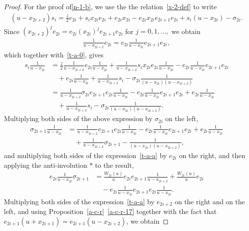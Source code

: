 \documentclass[11pt,a4paper,reqno,svgnames]{amsart}
\theoremstyle{plain}
\theoremstyle{definition}
\numberwithin{equation}{section}
\begin{document}
\begin{proof}
For the proof of\eqref{n-1-b}, we use the the relation~\eqref{x-2-def} to write
\begin{align}\label{t-a-0}
(u-x_{2i+2})s_i={\textstyle\frac{z}{2}}e_{2i}+s_ix_{2i}e_{2i}+e_{2i}x_{2i}-e_{2i}x_{2i}e_{2i+1}e_{2i}+s_i(u-x_{2i})-\sigma_{2i}.
\end{align}
Since $(x_{2i+2})^je_{2i}=e_{2i}(x_{2i})^je_{2i+1}e_{2i}$ for $j=0,1,\ldots,$ we obtain
\begin{align*}
\frac{1}{u-x_{2i+2}}e_{2i}=e_{2i}\frac{1}{u-x_{2i}}e_{2i+1}e_{2i}, 
\end{align*}
which together with~\eqref{t-a-0}, gives 
\begin{align*}
s_i\frac{1}{u-x_{2i}}&=\frac{z}{2}\frac{1}{u-x_{2i+2}}e_{2i}\frac{1}{u-x_{2i}}+\frac{1}{u-x_{2i+2}}s_ix_{2i}e_{2i}\frac{1}{u-x_{2i}}-e_{2i}\frac{1}{u-x_{2i}}e_{2i+1}e_{2i}\\
&\quad+e_{2i}\frac{1}{u-x_{2i}}+\frac{1}{u-x_{2i+2}}s_i-\sigma_{2i}\frac{1}{(u-x_{2i})(u-x_{2i+2})}\\
&=\frac{1}{u-x_{2i+2}}\sigma_{2i}e_{2i+1}e_{2i}\frac{1}{u-x_{2i}}-e_{2i}\frac{1}{u-x_{2i}}e_{2i+1}e_{2i}
+e_{2i}\frac{1}{u-x_{2i}}\\
&\quad+\frac{1}{u-x_{2i+2}}s_i-\sigma_{2i}\frac{1}{(u-x_{2i})(u-x_{2i+2})}. 
\end{align*}
Multiplying both sides of the above expression by $\sigma_{2i}$ on the left, 
\begin{equation}\label{t-a-a}
\begin{split}
\sigma_{2i+1}\frac{1}{u-x_{2i}}&=\frac{1}{u-x_{2i+2}}e_{2i+1}e_{2i}\frac{1}{u-x_{2i}}-e_{2i}\frac{1}{u-x_{2i}}e_{2i+1}e_{2i}
+e_{2i}\frac{1}{u-x_{2i}}\\
&\quad+\frac{1}{u-x_{2i+2}}\sigma_{2i+1}-\frac{1}{(u-x_{2i})(u-x_{2i+2})}, 
\end{split}
\end{equation}
and multiplying both sides of the expression~\eqref{t-a-a} by $e_{2i}$ on the right, and then applying the anti-involution $*$ to the result,
\begin{equation}\label{t-a-b}
\begin{split}
e_{2i}\frac{1}{u-x_{2i}}\sigma_{2i+1}&=
\frac{W_{2i}(u)}{u}e_{2i}e_{2i+1}\frac{1}{u-x_{2i+2}}
+\frac{W_{2i}(u)}{u}e_{2i}\\
&\quad-e_{2i}\frac{1}{u-x_{2i}}e_{2i+1}e_{2i}\frac{1}{u-x_{2i}}.
\end{split}
\end{equation}
Multiplying both sides of the expression~\eqref{t-a-a} by $e_{2i+2}$ on the right and on the left, and using Proposition~\ref{a-c-r}~\eqref{a-c-r-17} together with the fact that $e_{2i+1}(u+x_{2i+1})=e_{2i+1}(u-x_{2i+2})$, we obtain

\end{proof}
\end{document}
